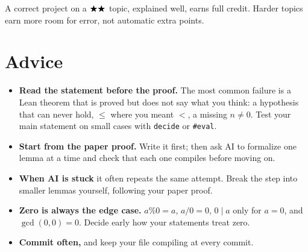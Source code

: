 \documentclass[11pt]{article}
\newcommand{\lean}[1]{\texttt{#1}}
\newcommand{\dvd}{\ensuremath{\mid}}
\newcommand{\stars}[1]{\ensuremath{%
  \ifcase#1\or\bigstar\or\bigstar\bigstar\or\bigstar\bigstar\bigstar\or
  \bigstar\bigstar\bigstar\bigstar\or\bigstar\bigstar\bigstar\bigstar\bigstar\fi}}
\begin{document}
A correct project on a \stars{2} topic, explained well, earns full credit. Harder topics earn
more room for error, not automatic extra points.

\section{Advice}
\begin{itemize}
\item \textbf{Read the statement before the proof.} The most common failure is a Lean theorem
  that is proved but does not say what you think: a hypothesis that can never hold, $\le$ where
  you meant $<$, a missing $n \ne 0$. Test your main statement on small cases with \lean{decide}
  or \lean{\#eval}.
\item \textbf{Start from the paper proof.} Write it first; then ask AI to formalize one lemma at a
  time and check that each one compiles before moving on.
\item \textbf{When AI is stuck} it often repeats the same attempt. Break the step into smaller
  lemmas yourself, following your paper proof.
\item \textbf{Zero is always the edge case.} $a \% 0 = a$, $a / 0 = 0$, $0 \dvd a$ only for
  $a = 0$, and $\gcd(0, 0) = 0$. Decide early how your statements treat zero.
\item \textbf{Commit often,} and keep your file compiling at every commit.
\end{itemize}
\end{document}
